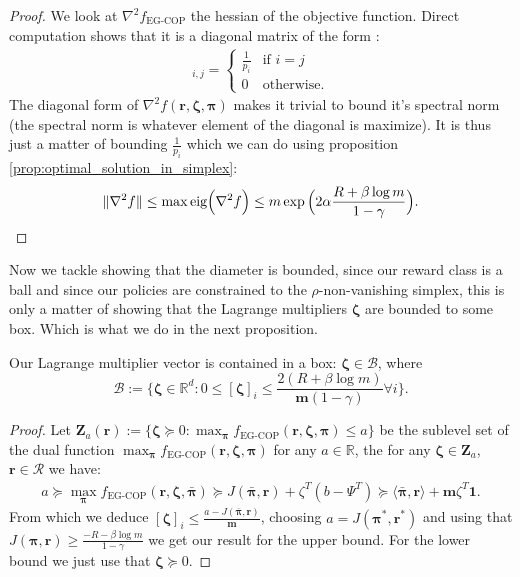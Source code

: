 \begin{proof}
    We look at $\nabla^2 f_\text{EG-COP}$ the hessian of the objective function. Direct computation shows that it is a diagonal matrix of the form :
    \begin{align*}
        [\nabla^2 f(\bm{r},\bm{\zeta},\bm{\pi})]_{i,j} = \begin{cases}
            \frac{1}{p_i} & \text{if } i=j\\
            0 & \text{otherwise}.
        \end{cases}
    \end{align*}
    The diagonal form of $\nabla^2 f(\bm{r},\bm
    {\zeta},\bm{\pi})$ makes it trivial to bound it's spectral norm (the spectral norm is whatever element of the diagonal is maximize). It is thus just a matter of bounding $\frac{1}{p_i}$ which we can do using proposition \ref{prop:optimal_solution_in_simplex}:
    \begin{align*}
        \| \nabla^2 f \| \leq \max \text{eig} \Bigl( \nabla^2 f \Bigr) \leq m \exp \Big( 2 \alpha \frac{R +\beta \log m}{1-\gamma}  \Big).
    \end{align*}
\end{proof}

Now we tackle showing that the diameter is bounded, since our reward class is a ball and since our policies are constrained to the $\rho$-non-vanishing simplex, this is only a matter of showing that the Lagrange multipliers $\bm{\zeta}$ are bounded to some box. Which is what we do in the next proposition.

\begin{proposition}
    \label{prop:bounded_zeta} Our Lagrange multiplier vector is contained in a box: $\bm{\zeta} \in \mathcal{B}$, where 
    \[ \mathcal{B} := \Bigg\{ \bm{\zeta}\in\mathbb{R}^d : 0\leq[\bm{\zeta}]_i  \leq \frac{2(R +\beta \log m)}{\bm{m} (1-\gamma)} \forall i \Bigg\}.\]
\end{proposition}

\begin{proof}
    Let $\bm{Z}_a(\bm{r}) := \{ \bm{\zeta} \succcurlyeq 0 : \max_{\bm{\pi}}f_\text{EG-COP}(\bm{r},\bm{\zeta},\bm{\pi}) \leq a \}$ be the sublevel set of the dual function $\max_{\bm{\pi}}f_\text{EG-COP}(\bm{r},\bm{\zeta},\bm{\pi})$ for any $a \in \mathbb{R}$, the for any $\bm{\zeta} \in \bm{Z}_a$, $\bm{r} \in \mathcal{R}$ we have:
    \begin{align*}
        a \succcurlyeq \max_{\bm{\pi}}f_\text{EG-COP}(\bm{r},\bm{\zeta},\bar{\bm{\pi}}) \succcurlyeq J( \bar{\bm{\pi}},\bm{r}) + \zeta^T (b - \Psi^T) \succcurlyeq \langle \bar{\bm{\pi}},\bm{r}\rangle + \bm{m} \zeta^T \mathbf{1}.
    \end{align*}
    From which we deduce $[\bm{\zeta}]_i \leq \frac{a-J( \bar{\bm{\pi}},\bm{r})}{\bm{m}}$, choosing $a=J(\bm{\pi}^*,\bm{r}^*)$ and using that $J(\bm{\pi},\bm{r}) \geq \frac{-R -\beta \log m}{1-\gamma}$ we get our result for the upper bound. For the lower bound we just use that $\bm{\zeta} \succcurlyeq 0$.
\end{proof}

